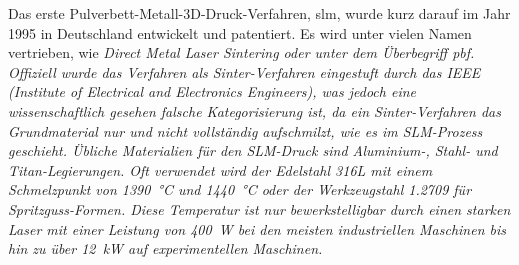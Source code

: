 \documentclass[../main.tex]{subfiles}
\begin{document}
Das erste Pulverbett-Metall-3D-Druck-Verfahren, \acrfull{slm}, wurde kurz darauf im Jahr 1995 in Deutschland entwickelt und patentiert. Es wird unter vielen Namen vertrieben, wie \it{Direct Metal Laser Sintering} oder unter dem Überbegriff \acrlong{pbf}. Offiziell wurde das Verfahren als Sinter-Verfahren eingestuft durch das IEEE (\it{Institute of Electrical and Electronics Engineers}), was jedoch eine wissenschaftlich gesehen falsche Kategorisierung ist, da ein Sinter-Verfahren das Grundmaterial nur  und nicht vollständig aufschmilzt, wie es im SLM-Prozess geschieht. \parencite{SINTER_SMELT} Übliche Materialien für den SLM-Druck sind Aluminium-, Stahl- und Titan-Legierungen. Oft verwendet wird der Edelstahl 316L mit einem Schmelzpunkt von \qty{1390}{\celsius} und \qty{1440}{\degreeCelsius} \parencite{610LSTEEL} oder der Werkzeugstahl 1.2709 für Spritzguss-Formen. \parencite{steel12709} Diese Temperatur ist nur bewerkstelligbar durch einen starken Laser mit einer Leistung von \qty{400}{\watt} bei den meisten industriellen Maschinen bis hin zu über \qty{12}{\kilo\watt} auf experimentellen Maschinen.
\end{document}
